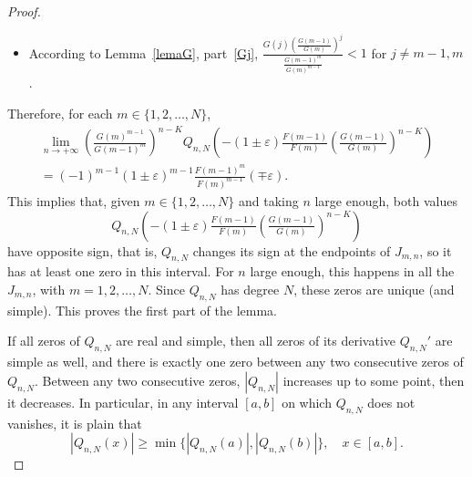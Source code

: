 \documentclass[10pt,a4paper]{amsart}
\newcommand{\eps}{\varepsilon}
\begin{document}
\begin{proof}
\begin{itemize}
\item According to Lemma~\ref{lemaG}, part~\eqref{Gj}, $\frac{G(j) \left(\tfrac{G(m-1)}{G(m)}\right)^j}
  {\tfrac{G(m-1)^m}{G(m)^{m-1}}} < 1$ for $j \ne m-1, m$.
\end{itemize}
Therefore, for each $m \in \{1,2,\dots,N\}$,
\begin{multline}
\label{limQnM}
  \lim_{n\to +\infty} \left( \tfrac{G(m)^{m-1}}{G(m-1)^m} \right)^{n-K} 
  Q_{n,N}\left( -(1\pm \eps) \tfrac{F(m-1)}{F(m)} 
  \left( \tfrac{G(m-1)}{G(m)} \right)^{n-K} \right)
  \\
  = (-1)^{m-1} (1\pm \eps)^{m-1} \tfrac{F(m-1)^m}{F(m)^{m-1}}
  (\mp \eps).
\end{multline}
This implies that, given $m \in \{1,2,\dots,N\}$ and taking $n$ large enough, both values
\begin{equation}
\label{QImndistintosigno}
  Q_{n,N}\left( -(1\pm \eps) \tfrac{F(m-1)}{F(m)} \left( \tfrac{G(m-1)}{G(m)} \right)^{n-K} \right)
\end{equation}
have opposite sign, that is, $Q_{n,N}$ changes its sign at the endpoints of $J_{m,n}$, so it has at least one zero in this interval. For $n$ large enough, this happens in all the $J_{m,n}$, with $m=1,2,\dots,N$. Since $Q_{n,N}$ has degree $N$, these zeros are unique (and simple). This proves the first part of the lemma.

If all zeros of $Q_{n,N}$ are real and simple, then all zeros of its derivative $Q_{n,N}'$ are simple as well, and there is exactly one zero between any two consecutive zeros of $Q_{n,N}$. Between any two consecutive zeros, $|Q_{n,N}|$ increases up to some point, then it decreases. In particular, in any interval $[a,b]$ on which $Q_{n,N}$ does not vanishes, it is plain that
\[
  |Q_{n,N}(x)| \ge \min\{ |Q_{n,N}(a)|, |Q_{n,N}(b)|\},
  \quad x \in [a,b].
\]


\end{proof}
\end{document}
